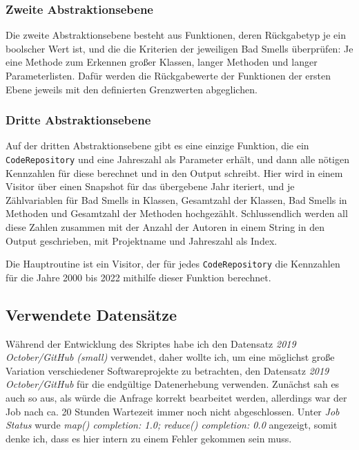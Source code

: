 \documentclass[12pt]{article}
\begin{document}
\subsubsection{Zweite Abstraktionsebene}
Die zweite Abstraktionsebene besteht aus Funktionen, deren Rückgabetyp je ein boolscher Wert ist, und die die Kriterien der jeweiligen Bad Smells überprüfen: Je eine Methode zum Erkennen großer Klassen, langer Methoden und langer Parameterlisten.
Dafür werden die Rückgabewerte der Funktionen der ersten Ebene jeweils mit den definierten Grenzwerten abgeglichen.

\subsubsection{Dritte Abstraktionsebene}
Auf der dritten Abstraktionsebene gibt es eine einzige Funktion, die ein \texttt{CodeRepository} und eine Jahreszahl als Parameter erhält, und dann alle nötigen Kennzahlen für diese berechnet und in den Output schreibt.
Hier wird in einem Visitor über einen Snapshot für das übergebene Jahr iteriert, und je Zählvariablen für Bad Smells in Klassen, Gesamtzahl der Klassen, Bad Smells in Methoden und Gesamtzahl der Methoden hochgezählt.
Schlussendlich werden all diese Zahlen zusammen mit der Anzahl der Autoren in einem String in den Output geschrieben, mit Projektname und Jahreszahl als Index.

Die Hauptroutine ist ein Visitor, der für jedes \texttt{CodeRepository} die Kennzahlen für die Jahre 2000 bis 2022 mithilfe dieser Funktion berechnet.

\subsection{Verwendete Datensätze}
Während der Entwicklung des Skriptes habe ich den Datensatz \emph{2019 October/GitHub (small)} verwendet, daher wollte ich, um eine möglichst große Variation verschiedener Softwareprojekte zu betrachten, den Datensatz \emph{2019 October/GitHub} für die endgültige Datenerhebung verwenden.
Zunächst sah es auch so aus, als würde die Anfrage korrekt bearbeitet werden, allerdings war der Job nach ca. 20 Stunden Wartezeit immer noch nicht abgeschlossen.
Unter \emph{Job Status} wurde \emph{map() completion: 1.0; reduce() completion: 0.0} angezeigt, somit denke ich, dass es hier intern zu einem Fehler gekommen sein muss.



\end{document}
